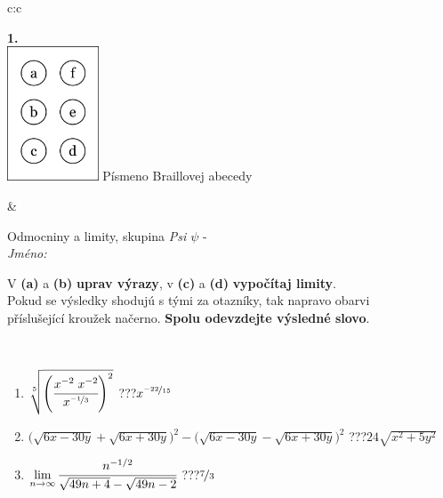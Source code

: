 \documentclass[10pt]{report}
\begin{document}
\begin{tabular}{c:c}
\begin{minipage}[c][104.5mm][t]{0.5\linewidth}
\begin{center}
\begin{minipage}{0.20\linewidth}
\begin{center}
{\Huge\bfseries 1.} \\[2mm]
\includegraphics[height=40mm]{../images/braille.png}
{\small Písmeno Braillovej abecedy}
\end{center}
\end{minipage}
\end{center}
\end{minipage}
&
\begin{minipage}[c][104.5mm][t]{0.5\linewidth}
\begin{center}
\vspace{7mm}
{\huge Odmocniny a limity, skupina \textit{Psi $\psi$} -}\\[5mm]
\textit{Jméno:}\phantom{xxxxxxxxxxxxxxxxxxxxxxxxxxxxxxxxxxxxxxxxxxxxxxxxxxxxxxxxxxxxxxxxx}\\[5mm]
\begin{minipage}{0.95\linewidth}
\begin{center}
V \textbf{(a)} a \textbf{(b)} \textbf{uprav výrazy}, v \textbf{(c)} a \textbf{(d)} \textbf{vypočítaj limity}.\\Pokud se výsledky shodujú s tými za otazníky, tak napravo obarvi\\příslušející kroužek načerno. \textbf{Spolu odevzdejte výsledné slovo}.
\end{center}
\end{minipage}
\\[1mm]
\begin{minipage}{0.79\linewidth}
\begin{center}
\begin{varwidth}{\linewidth}
\begin{enumerate}
\small
\item $\sqrt[5]{\left(\cfrac{x^{-2}\;x^{-2}}{x^{\nicefrac{-1}{3}}}\right)^{2}}$\quad \dotfill\; ???\;\dotfill \quad $x^{\nicefrac{-22}{15}}$
\item {\footnotesize{\scriptsize$\big(\sqrt{6x-30y}+\sqrt{6x+30y}\big)^2-\big(\sqrt{6x-30y}-\sqrt{6x+30y}\big)^2$}\quad \dotfill\; ???\;\dotfill \quad $24\sqrt{x^2+5y^2}$}
\item $\lim\limits_{n\to\infty}\cfrac{n^{-1/2}}{\sqrt{49n+4}-\sqrt{49n-2}}$\quad \dotfill\; ???\;\dotfill \quad $\nicefrac{7}{3}$

\end{enumerate}
\end{varwidth}
\end{center}
\end{minipage}
\end{center}
\end{minipage}
\end{tabular}
\end{document}
